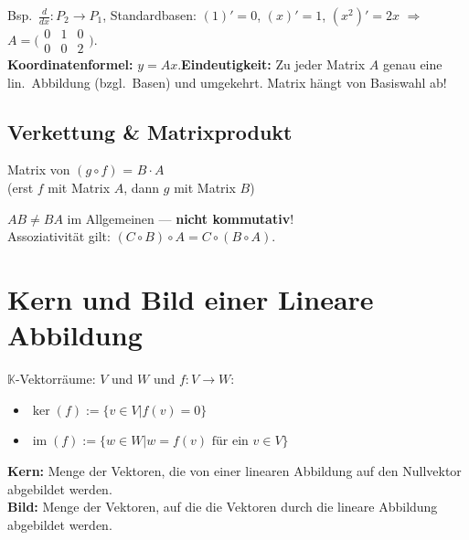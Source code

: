 \documentclass[10pt,a4paper,twocolumn]{article}
\newcommand{\seccol}{black}
\newcommand{\setseccol}[1]{\renewcommand{\seccol}{#1}}
\newcommand{\detail}[1]{{\small\color{detail}#1}}
\begin{document}
	\detail{Bsp.\ $\frac{d}{dx}:P_2\to P_1$, Standardbasen: $(1)'=0$, $(x)'=1$, $(x^2)'=2x$ $\Rightarrow$ $A=\bigl(\begin{smallmatrix}0&1&0\\0&0&2\end{smallmatrix}\bigr)$.\\
		\textbf{Koordinatenformel:} $y=Ax$.\quad \textbf{Eindeutigkeit:} Zu jeder Matrix $A$ genau eine lin.\ Abbildung (bzgl.\ Basen) und umgekehrt. Matrix hängt von Basiswahl ab!}
	
	\subsection{Verkettung \& Matrixprodukt}
	
	\begin{tcolorbox}[defbox, title={Satz 6.3.2}]
		Matrix von $(g\circ f)$ = $B\cdot A$\\
		(erst $f$ mit Matrix $A$, dann $g$ mit Matrix $B$)
	\end{tcolorbox}
	
	\begin{tcolorbox}[tipbox]
		$AB\neq BA$ im Allgemeinen — \textbf{nicht kommutativ}!\\
		Assoziativität gilt: $(C\circ B)\circ A=C\circ(B\circ A)$.
	\end{tcolorbox}
	
	\setseccol{c7}
	\section{Kern und Bild einer Lineare Abbildung}
	
	\begin{tcolorbox}[defbox, title={Def. 7.1.1 — Vektorraum}]
		$\mathbb{K}$-Vektorräume: $V$ und $W$ und $f : V \to W$:
		\begin{itemize}
			\item $\ker(f) := \{v \in V | f(v)=0\}$
			\item $\operatorname{im}(f) := \{w \in W | w = f(v) \text{ für ein } v \in V\}$
		\end{itemize}
	\end{tcolorbox}
	
	\detail{%
		\textbf{Kern:} Menge der Vektoren, die von einer linearen
		Abbildung auf den Nullvektor abgebildet werden.\\
		\textbf{Bild:} Menge der Vektoren,
		auf die die Vektoren durch die lineare Abbildung abgebildet werden.\\
	}
	
\end{document}
